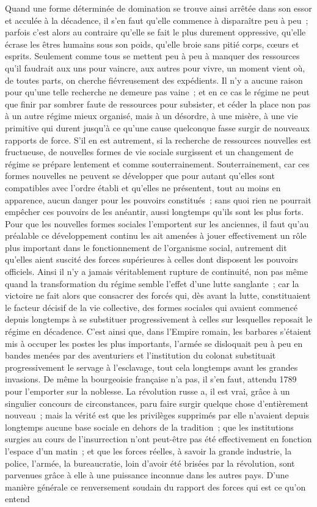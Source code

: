 \documentclass[french,twoside]{book} %
\begin{document}
Quand une forme déterminée de domination se trouve ainsi arrêtée dans son essor et acculée à la décadence, il s'en faut qu'elle commence à disparaître peu à peu ; parfois c'est alors au contraire qu'elle se fait le plus durement oppressive, qu'elle écrase les êtres humains sous son poids, qu'elle broie sans pitié corps, cœurs et esprits. Seulement comme tous se mettent peu à peu à manquer des ressources qu'il faudrait aux uns pour vaincre, aux autres pour vivre, un moment vient où, de toutes parts, on cherche fiévreusement des expédients. Il n'y a aucune raison pour qu'une telle recherche ne demeure pas vaine ; et en ce cas le régime ne peut que finir par sombrer faute de ressources pour subsister, et céder la place non pas à un autre régime mieux organisé, mais à un désordre, à une misère, à une vie primitive qui durent jusqu'à ce qu'une cause quelconque fasse surgir de nouveaux rapports de force. S'il en est autrement, si la recherche de ressources nouvelles est fructueuse, de nouvelles formes de vie sociale surgissent et un changement de régime se prépare lentement et comme souterrainement. Souterrainement, car ces formes nouvelles ne peuvent se développer que pour autant qu'elles sont compatibles avec l'ordre établi et qu'elles ne présentent, tout au moins en apparence, aucun danger pour les pouvoirs constitués ; sans quoi rien ne pourrait empêcher ces pouvoirs de les anéantir, aussi longtemps qu'ils sont les plus forts. Pour que les nouvelles formes sociales l'emportent sur les anciennes, il faut qu'au préalable ce développement continu les ait amenées à jouer effectivement un rôle plus important dans le fonctionnement de l'organisme social, autrement dit qu'elles aient suscité des forces supérieures à celles dont disposent les pouvoirs officiels. Ainsi il n'y a jamais véritablement rupture de continuité, non pas même quand la transformation du régime semble l'effet d'une lutte sanglante ; car la victoire ne fait alors que consacrer des forcés qui, dès avant la lutte, constituaient le facteur décisif de la vie collective, des formes sociales qui avaient commencé depuis longtemps à se substituer progressivement à celles sur lesquelles reposait le régime en décadence. C'est ainsi que, dans l'Empire romain, les barbares s'étaient mis à occuper les postes les plus importants, l'armée se disloquait peu à peu en bandes menées par des aventuriers et l'institution du colonat substituait progressivement le servage à l'esclavage, tout cela longtemps avant les grandes invasions. De même la bourgeoisie française n'a pas, il s'en faut, attendu 1789 pour l'emporter sur la noblesse. La révolution russe a, il est vrai, grâce à un singulier concours de circonstances, paru faire surgir quelque chose d'entièrement nouveau ; mais la vérité est que les privilèges supprimés par elle n'avaient depuis longtemps aucune base sociale en dehors de la tradition ; que les institutions surgies au cours de l'insurrection n'ont peut-être pas été effectivement en fonction l'espace d'un matin ; et que les forces réelles, à savoir la grande industrie, la police, l'armée, la bureaucratie, loin d'avoir été brisées par la révolution, sont parvenues grâce à elle à une puissance inconnue dans les autres pays. D'une manière générale ce renversement soudain du rapport des forces qui est ce qu'on entend 
\end{document}
